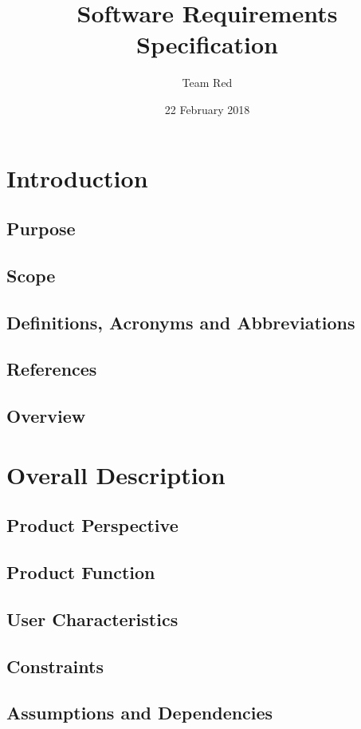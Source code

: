 \documentclass{article}
\title{Software Requirements Specification}
\date{22 February 2018}
\author{Team Red}
\begin{document}
	\maketitle
	\newpage
	\tableofcontents
	\newpage
	
	\section{Introduction}
	\subsection{Purpose}
	\subsection{Scope}
	\subsection{Definitions, Acronyms and Abbreviations}
	\subsection{References}
	\subsection{Overview}
	
	\section{Overall Description}
	\subsection{Product Perspective}
	\subsection{Product Function}
	\subsection{User Characteristics}
	\subsection{Constraints}
	\subsection{Assumptions and Dependencies}
	
\end{document}
